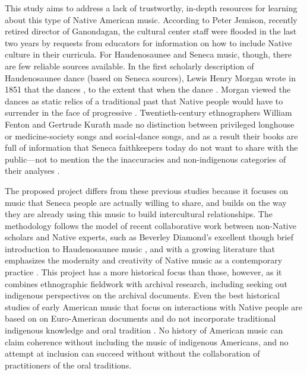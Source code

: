 \documentclass{neh}
\begin{document}
This study aims to address a lack of trustworthy, in-depth resources for
learning about this type of Native American music.
According to Peter Jemison, recently retired director of Ganondagan, the
cultural center staff were flooded in the last two years by requests from
educators for information on how to include Native culture in their curricula.
For Haudenosaunee and Seneca music, though, there are few reliable sources
available.
In the first scholarly description of Haudenosaunee dance (based on Seneca
sources), Lewis Henry Morgan wrote in 1851 that the dances , to the extent
that when the dance  
\Autocite[261, 263]{Morgan:League}.
Morgan viewed the dances as static relics of a traditional past that Native
people would have to surrender in the face of progressive
.
Twentieth-century ethnographers William Fenton and Gertrude Kurath made no
distinction between privileged longhouse or medicine-society songs and
social-dance songs, and as a result their books are full of information that
Seneca faithkeepers today do not want to share with the public---not to
mention the the inaccuracies and non-indigenous categories of their analyses
\Autocites{FentonKurath:EagleDance}{Kurath:IroquoisMusic}
{Caldwell:Kurath}{McCarthy:Iroquoianist}.

The proposed project differs from these previous studies because it focuses on
music that Seneca people are actually willing to share, and builds on the way
they are already using this music to build intercultural relationships.
The methodology follows the model of recent collaborative work between
non-Native scholars and Native experts, such as Beverley Diamond's excellent
though brief introduction to Haudenosaunee music 
\Autocite{Diamond:NativeAmericanNortheast},
and with a growing literature that emphasizes the modernity and creativity of
Native music as a contemporary practice
\Autocites
{Browner:FirstNations}
{Browner:Heartbeat}
{LevineRobinson:MusicModernity}.
This project has a more historical focus than those, however, as it combines
ethnographic fieldwork with archival research, including seeking out
indigenous perspectives on the archival documents.
Even the best historical studies of early American music that focus on
interactions with Native people are based on on Euro-American documents and
do not incorporate traditional indigenous knowledge and oral tradition 
\Autocites{Goodman:IndianPsalmody}{Eyerly:Moravian}.
No history of American music can claim coherence without including the music
of indigenous Americans, and no attempt at inclusion can succeed without
without the collaboration of practitioners of the oral traditions.
\end{document}
